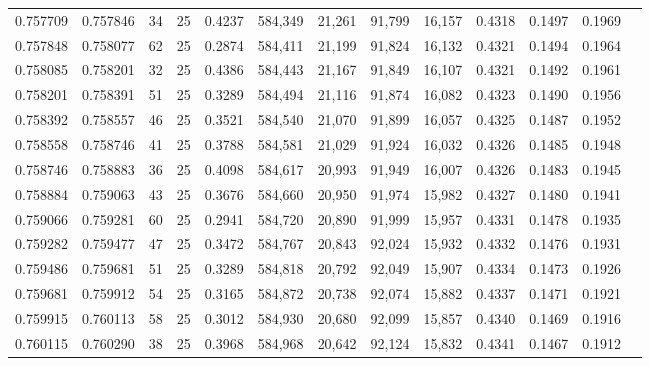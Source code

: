 \begin{tabular}{rrrrrrrrrrrrr}
0.757709 & 0.757846 &    34 &  25 &                                     0.4237 & 584,349 &  21,261 &  91,799 &  16,157 & 0.4318 & 0.1497 & 0.1969 \\
0.757848 & 0.758077 &    62 &  25 &                                     0.2874 & 584,411 &  21,199 &  91,824 &  16,132 & 0.4321 & 0.1494 & 0.1964 \\
0.758085 & 0.758201 &    32 &  25 &                                     0.4386 & 584,443 &  21,167 &  91,849 &  16,107 & 0.4321 & 0.1492 & 0.1961 \\
0.758201 & 0.758391 &    51 &  25 &                                     0.3289 & 584,494 &  21,116 &  91,874 &  16,082 & 0.4323 & 0.1490 & 0.1956 \\
0.758392 & 0.758557 &    46 &  25 &                                     0.3521 & 584,540 &  21,070 &  91,899 &  16,057 & 0.4325 & 0.1487 & 0.1952 \\
0.758558 & 0.758746 &    41 &  25 &                                     0.3788 & 584,581 &  21,029 &  91,924 &  16,032 & 0.4326 & 0.1485 & 0.1948 \\
0.758746 & 0.758883 &    36 &  25 &                                     0.4098 & 584,617 &  20,993 &  91,949 &  16,007 & 0.4326 & 0.1483 & 0.1945 \\
0.758884 & 0.759063 &    43 &  25 &                                     0.3676 & 584,660 &  20,950 &  91,974 &  15,982 & 0.4327 & 0.1480 & 0.1941 \\
0.759066 & 0.759281 &    60 &  25 &                                     0.2941 & 584,720 &  20,890 &  91,999 &  15,957 & 0.4331 & 0.1478 & 0.1935 \\
0.759282 & 0.759477 &    47 &  25 &                                     0.3472 & 584,767 &  20,843 &  92,024 &  15,932 & 0.4332 & 0.1476 & 0.1931 \\
0.759486 & 0.759681 &    51 &  25 &                                     0.3289 & 584,818 &  20,792 &  92,049 &  15,907 & 0.4334 & 0.1473 & 0.1926 \\
0.759681 & 0.759912 &    54 &  25 &                                     0.3165 & 584,872 &  20,738 &  92,074 &  15,882 & 0.4337 & 0.1471 & 0.1921 \\
0.759915 & 0.760113 &    58 &  25 &                                     0.3012 & 584,930 &  20,680 &  92,099 &  15,857 & 0.4340 & 0.1469 & 0.1916 \\
0.760115 & 0.760290 &    38 &  25 &                                     0.3968 & 584,968 &  20,642 &  92,124 &  15,832 & 0.4341 & 0.1467 & 0.1912 \\

\end{tabular}
